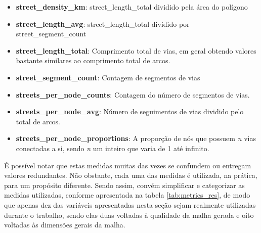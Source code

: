 \begin{itemize}
    \item \textbf{street\_density\_km}: street\_length\_total dividido pela área do polígono
    \item \textbf{street\_length\_avg}: street\_length\_total dividido por street\_segment\_count
    \item \textbf{street\_length\_total}: Comprimento total de vias, em geral obtendo valores bastante similares ao comprimento total de arcos.
    \item \textbf{street\_segment\_count}: Contagem de segmentos de vias
    \item \textbf{streets\_per\_node\_counts}: Contagem do número de segmentos de vias.
    \item \textbf{streets\_per\_node\_avg}: Número de seguimentos de vias dividido pelo total de arcos.  
    \item \textbf{streets\_per\_node\_proportions}: A proporção de nós que possuem \textit{n} vias conectadas a si, sendo \textit{n} um inteiro que varia de 1 até infinito.
\end{itemize}

É possível notar que estas medidas muitas das vezes se confundem ou entregam valores redundantes. 
Não obstante, cada uma das medidas é utilizada, na prática, para um propósito diferente.
Sendo assim, convém simplificar e categorizar as medidas utilizadas, conforme apresentada na tabela \ref{tab:metrics_res}, de modo que apenas dez das variáveis apresentadas nesta seção sejam realmente utilizadas durante o trabalho, sendo elas duas voltadas à qualidade da malha gerada e oito voltadas às dimensões gerais da malha.

